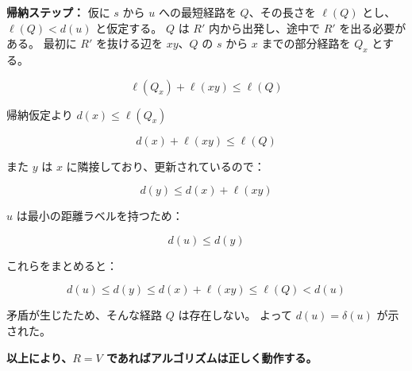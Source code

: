 \documentclass{article}
\begin{document}
\textbf{帰納ステップ：}  
仮に $s$ から $u$ への最短経路を $Q$、その長さを $\ell(Q)$ とし、$\ell(Q) < d(u)$ と仮定する。  
$Q$ は $R'$ 内から出発し、途中で $R'$ を出る必要がある。  
最初に $R'$ を抜ける辺を $xy$、$Q$ の $s$ から $x$ までの部分経路を $Q_x$ とする。

\[
\ell(Q_x) + \ell(xy) \leq \ell(Q)
\]

帰納仮定より $d(x) \leq \ell(Q_x)$

\[
d(x) + \ell(xy) \leq \ell(Q)
\]

また $y$ は $x$ に隣接しており、更新されているので：

\[
d(y) \leq d(x) + \ell(xy)
\]

$u$ は最小の距離ラベルを持つため：

\[
d(u) \leq d(y)
\]

これらをまとめると：

\[
d(u) \leq d(y) \leq d(x) + \ell(xy) \leq \ell(Q) < d(u)
\]

矛盾が生じたため、そんな経路 $Q$ は存在しない。  
よって $d(u) = \delta(u)$ が示された。

\textbf{以上により、$R = V$ であればアルゴリズムは正しく動作する。}
\end{document}
